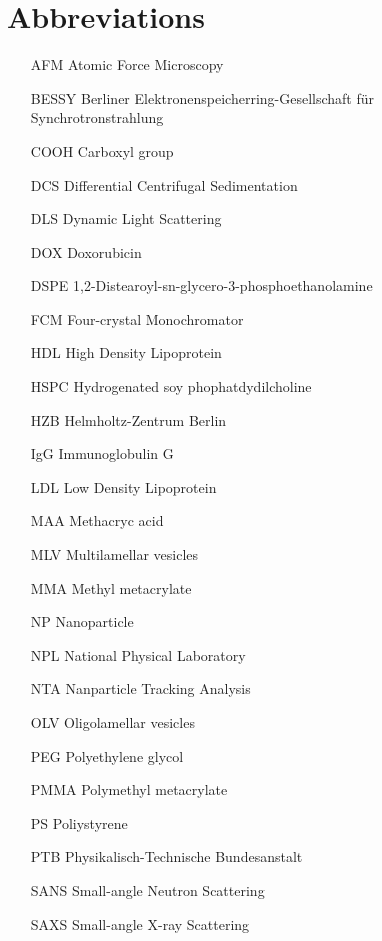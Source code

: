 \section*{Abbreviations}

\begin{itemize}
        \item   [AFM] Atomic Force Microscopy
        \item   [BESSY] Berliner Elektronenspeicherring-Gesellschaft für Synchrotronstrahlung
        \item   [COOH] Carboxyl group
        \item   [DCS] Differential Centrifugal Sedimentation
        \item   [DLS] Dynamic Light Scattering
        \item   [DOX] Doxorubicin        
        \item   [DSPE] 1,2-Distearoyl-sn-glycero-3-phosphoethanolamine
        \item   [FCM] Four-crystal Monochromator
        \item   [HDL] High Density Lipoprotein
        \item   [HSPC] Hydrogenated soy phophatdydilcholine
        \item   [HZB] Helmholtz-Zentrum Berlin
        \item   [IgG] Immunoglobulin G
        \item   [LDL] Low Density Lipoprotein
        \item   [MAA] Methacryc acid
        \item   [MLV] Multilamellar vesicles
        \item   [MMA] Methyl metacrylate        
        \item   [NP] Nanoparticle
        \item   [NPL] National Physical Laboratory
        \item   [NTA] Nanparticle Tracking Analysis        
        \item   [OLV] Oligolamellar vesicles
        \item   [PEG] Polyethylene glycol
        \item   [PMMA] Polymethyl metacrylate
        \item   [PS] Poliystyrene
        \item   [PTB] Physikalisch-Technische Bundesanstalt
        \item   [SANS] Small-angle Neutron Scattering
        \item   [SAXS] Small-angle X-ray Scattering

\end{itemize}
